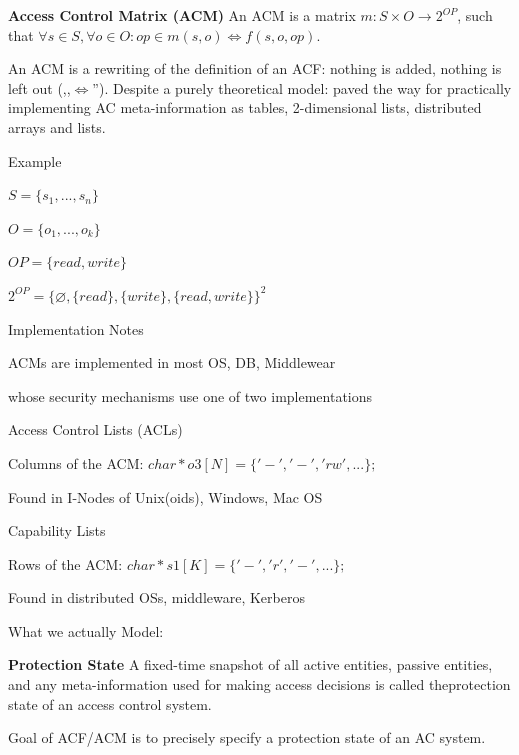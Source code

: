 \documentclass[a4paper]{article}
\renewcommand{\note}[2]{\begin{noteBox} \textbf{#1} #2 \end{noteBox}}
\begin{document}
\begin{multicols}{3}
    \note{Access Control Matrix (ACM)}{An ACM is a matrix $m:S\times O \rightarrow 2^{OP}$, such that $\forall s\in S,\forall o\in O:op\in m(s,o)\Leftrightarrow f(s,o,op)$.}

    An ACM is a rewriting of the definition of an ACF: nothing is added, nothing is left out (,,$\Leftrightarrow$''). Despite a purely theoretical model: paved the way for practically implementing AC meta-information as tables, 2-dimensional lists, distributed arrays and lists.

    Example
    \begin{itemize*}
        \item $S=\{s_1 ,...,s_n\}$
        \item $O=\{o_1 ,...,o_k\}$
        \item $OP=\{read,write\}$
        \item $2^{OP}=\{\varnothing,\{read\},\{write\},\{read,write\}\}^2$
    \end{itemize*}

    Implementation Notes
    \begin{itemize*}
        \item ACMs are implemented in most OS, DB, Middlewear
        \item whose security mechanisms use one of two implementations
    \end{itemize*}

    Access Control Lists (ACLs)
    \begin{itemize*}
        \item Columns of the ACM: $char*o3[N]=\{ '-', '-', 'rw', ...\};$
        \item Found in I-Nodes of Unix(oids), Windows, Mac OS
    \end{itemize*}

    Capability Lists
    \begin{itemize*}
        \item Rows of the ACM: $char* s1[K]=\{'-', 'r', '-', ...\};$
        \item Found in distributed OSs, middleware, Kerberos
    \end{itemize*}

    What we actually Model:
    \note{Protection State}{A fixed-time snapshot of all active entities, passive entities, and any meta-information used for making access decisions is called theprotection state of an access control system.}

    Goal of ACF/ACM is to precisely specify a protection state of an AC system.


\end{multicols}
\end{document}
